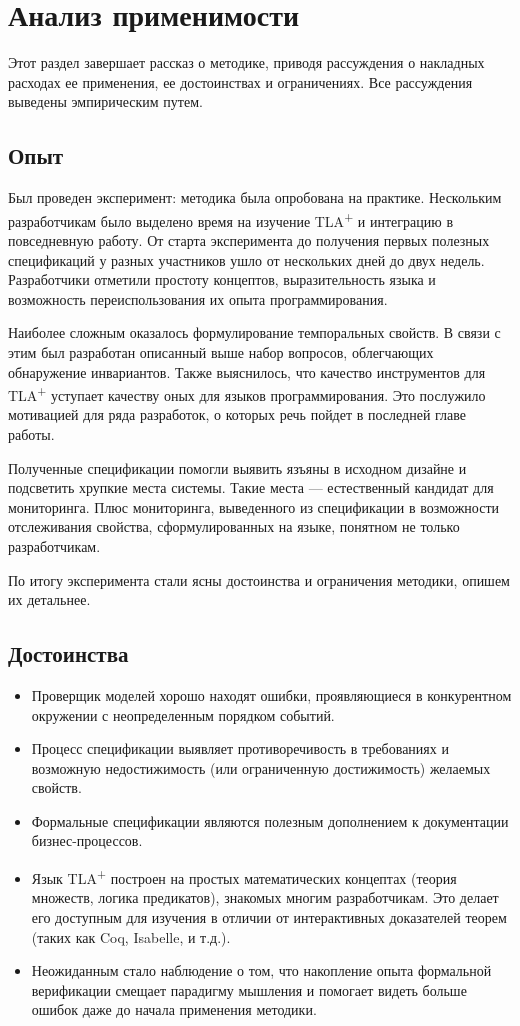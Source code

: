 \documentclass[14pt, openany]{report}
\newcommand{\tlapl}{TLA\textsuperscript{+} }
\begin{document}
\section{Анализ применимости}
Этот раздел завершает рассказ о методике, приводя рассуждения о накладных расходах ее применения, ее достоинствах и ограничениях.
Все рассуждения выведены эмпирическим путем.

\subsection{Опыт}
Был проведен эксперимент: методика была опробована на практике. Нескольким разработчикам было выделено время на изучение \tlapl и интеграцию в повседневную работу. От старта эксперимента до получения первых полезных спецификаций у разных участников ушло от нескольких дней до двух недель. Разработчики отметили простоту концептов, выразительность языка и возможность переиспользования их опыта программирования. 

Наиболее сложным оказалось формулирование темпоральных свойств. В связи с этим был разработан описанный выше набор вопросов, облегчающих обнаружение инвариантов. Также выяснилось, что качество инструментов для \tlapl уступает качеству оных для языков программирования. Это послужило мотивацией для ряда разработок, о которых речь пойдет в последней главе работы.

Полученные спецификации помогли выявить язъяны в исходном дизайне и подсветить хрупкие места системы. Такие места --- естественный кандидат для мониторинга. Плюс мониторинга, выведенного из спецификации в возможности отслеживания свойства, сформулированных на языке, понятном не только разработчикам.

По итогу эксперимента стали ясны достоинства и ограничения методики, опишем их детальнее.

\subsection{Достоинства}
\begin{itemize}
  \item Проверщик моделей хорошо находят ошибки, проявляющиеся в конкурентном окружении с неопределенным порядком событий.
  \item Процесс спецификации выявляет противоречивость в требованиях и возможную недостижимость (или ограниченную достижимость) желаемых свойств.
  \item Формальные спецификации являются полезным дополнением к документации бизнес-процессов.
  \item Язык \tlapl построен на простых математических концептах (теория множеств, логика предикатов), знакомых многим разработчикам. Это делает его доступным для изучения в отличии от интерактивных доказателей теорем (таких как Coq, Isabelle, и т.д.).
  \item Неожиданным стало наблюдение о том, что накопление опыта формальной верификации смещает парадигму мышления и помогает видеть больше ошибок даже до начала применения методики.
\end{itemize}
\end{document}
